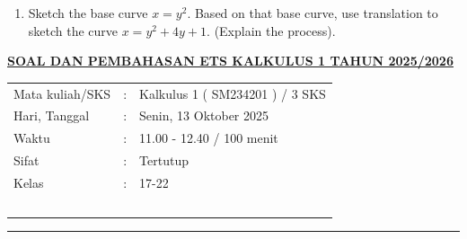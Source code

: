 \documentclass[10pt,openany,a4paper]{article}
\theoremstyle{definition}
\theoremstyle{definition}
\theoremstyle{plain}
\begin{document}
\begin{enumerate}
    \item Sketch the base curve \(x = y^2\). Based on that base curve, use translation to sketch the curve \(x = y^2 + 4y + 1\). (Explain the process).

        \end{enumerate}
               \newpage
 \begin{center}
	{\underline{\textbf{\MakeUppercase{Soal dan Pembahasan ETS Kalkulus 1 Tahun 2025/2026}}}}
    \end{center}

    \begin{center}
	\begin{tabular}{lcl}
		Mata kuliah/SKS & : & Kalkulus 1 ( SM234201 ) / 3 SKS\\
		Hari, Tanggal & : & Senin, 13 Oktober 2025\\
		Waktu & : & 11.00 - 12.40 / 100 menit\\
		Sifat & : & Tertutup\\
		Kelas & : & 17-22\\
  ~
	\end{tabular}
    
    \noindent\rule{\textwidth}{2.pt}
        \end{center}
\end{document}
